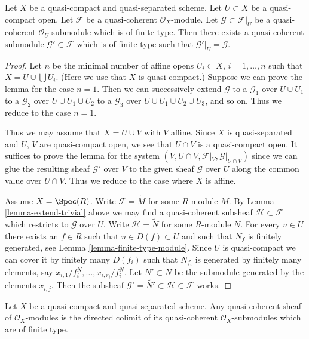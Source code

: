 \begin{lemma}
\label{lemma-extend}
Let $X$ be a quasi-compact and quasi-separated scheme.
Let $U \subset X$ be a quasi-compact open.
Let $\mathcal{F}$ be a quasi-coherent $\mathcal{O}_X$-module.
Let $\mathcal{G} \subset \mathcal{F}|_U$ be a quasi-coherent
$\mathcal{O}_U$-submodule which is of finite type. Then
there exists a quasi-coherent submodule $\mathcal{G}' \subset \mathcal{F}$
which is of finite type such that $\mathcal{G}'|_U = \mathcal{G}$.
\end{lemma}

\begin{proof}
Let $n$ be the minimal number of affine opens $U_i \subset X$,
$i = 1, \ldots , n$ such that $X = U \cup \bigcup U_i$.
(Here we use that $X$ is quasi-compact.) Suppose
we can prove the lemma for the case $n = 1$. Then we can successively
extend $\mathcal{G}$
to a $\mathcal{G}_1$ over $U \cup U_1$
to a $\mathcal{G}_2$ over $U \cup U_1 \cup U_2$
to a $\mathcal{G}_3$ over $U \cup U_1 \cup U_2 \cup U_3$,
and so on.
Thus we reduce to the case $n = 1$.

\medskip\noindent
Thus we may assume that $X = U \cup V$ with $V$ affine.
Since $X$ is quasi-separated and $U$, $V$ are quasi-compact open,
we see that $U \cap V$ is a quasi-compact open. It suffices to prove the
lemma for the system $(V, U \cap V, \mathcal{F}|_V, \mathcal{G}|_{U \cap V})$
since we can glue the resulting sheaf $\mathcal{G}'$ over $V$
to the given sheaf $\mathcal{G}$ over $U$ along the common value
over $U \cap V$.
Thus we reduce to the case where $X$ is affine.

\medskip\noindent
Assume $X = \Spec(R)$. Write $\mathcal{F} = \widetilde M$
for some $R$-module $M$. By Lemma \ref{lemma-extend-trivial} above we may
find a quasi-coherent subsheaf $\mathcal{H} \subset \mathcal{F}$
which restricts to $\mathcal{G}$ over $U$.
Write $\mathcal{H} = \widetilde N$ for some $R$-module $N$.
For every $u \in U$ there exists an $f \in R$ such that
$u \in D(f) \subset U$ and such that $N_f$ is finitely generated,
see Lemma \ref{lemma-finite-type-module}.
Since $U$ is quasi-compact we can cover it by finitely
many $D(f_i)$ such that $N_{f_i}$ is generated by
finitely many elements, say $x_{i, 1}/f_i^N, \ldots, x_{i, r_i}/f_i^N$.
Let $N' \subset N$ be the submodule generated by the elements
$x_{i, j}$. Then the subsheaf
$\mathcal{G}' = \widetilde{N'} \subset \mathcal{H} \subset \mathcal{F}$
works.
\end{proof}

\begin{lemma}
\label{lemma-quasi-coherent-colimit-finite-type}
Let $X$ be a quasi-compact and quasi-separated scheme.
Any quasi-coherent sheaf of $\mathcal{O}_X$-modules
is the directed colimit of its quasi-coherent
$\mathcal{O}_X$-submodules which are of finite type.
\end{lemma}

